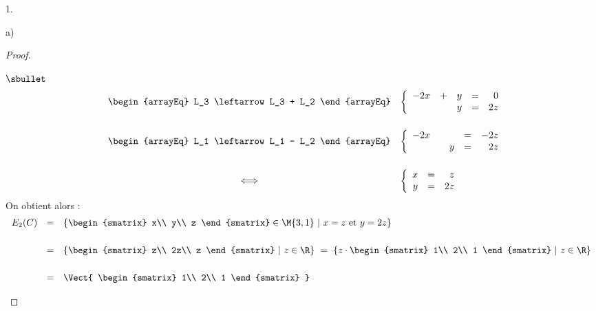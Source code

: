 \documentclass[11pt]{article}%
\begin{document}
\begin{noliste}{1.}
\begin{noliste}{a)}
\begin{proof}
\begin{noliste}{$\sbullet$}
\[\begin{array}{rcl}
          &
          \begin{arrayEq}
            L_3 \leftarrow L_3 + L_2
          \end{arrayEq}
          &
          \left\{
            \begin{array}{rrrcr}
              -2x & + & y & = & 0\\
              & & y & = & 2z
            \end{array}
          \right.
          \\[.8cm]
          &
          \begin{arrayEq}
            L_1 \leftarrow L_1 - L_2
          \end{arrayEq}
          &
          \left\{
            \begin{array}{rrrcr}
              -2x & & & = & -2z\\
              & & y & = & 2z
            \end{array}
          \right.
          \\[.8cm]
          & \Longleftrightarrow & 
          \left\{
            \begin{array}{rcr}
              x & = & z\\
              y & = & 2z
            \end{array}
          \right.
	\end{array}
	\]	
	On obtient alors :
	\[
	\begin{array}{rcl}
          E_2(C) & = & \{
          \begin{smatrix}
            x\\
            y\\
            z
          \end{smatrix}
          \in \M{3,1}
          \ | \ 
          x=z \mbox{ et } y=2z \}
          \\[.6cm]
          & = & \{
          \begin{smatrix}
            z\\
            2z\\
            z
          \end{smatrix}
          \ | \ 
          z \in\R \}
          \ = \ \{z \cdot
          \begin{smatrix}
            1\\
            2\\
            1
          \end{smatrix}
          \ | \ 
          z \in\R \}
          \\[.6cm]
          & = & \Vect{
            \begin{smatrix}
              1\\
              2\\
              1
            \end{smatrix}
          }
        \end{array}
	\]
	

\end{noliste}
\end{proof}
\end{noliste}
\end{noliste}
\end{document}
